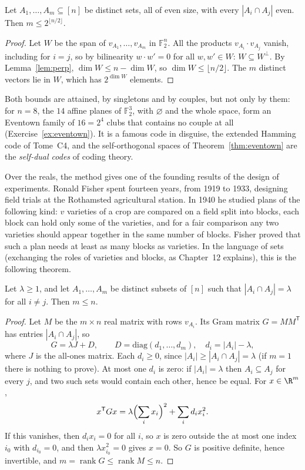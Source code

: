 \begin{theorem}\label{thm:eventown}
Let $A_1,\dots,A_m\subseteq[n]$ be distinct sets, all of even size, with every $|A_i\cap A_j|$ even. Then $m\le2^{\lfloor n/2\rfloor}$.
\end{theorem}
\begin{proof}
Let $W$ be the span of $v_{A_1},\dots,v_{A_m}$ in $\mathbb F_2^n$. All the products $v_{A_i}\cdot v_{A_j}$ vanish, including for $i=j$, so by bilinearity $w\cdot w'=0$ for
all $w,w'\in W$: $W\subseteq W^\perp$. By Lemma~\ref{lem:perp}, $\dim W\le n-\dim W$, so $\dim W\le\lfloor n/2\rfloor$. The $m$ distinct vectors lie in $W$, which has
$2^{\dim W}$ elements.
\end{proof}

Both bounds are attained, by singletons and by couples, but not only by them: for $n=8$, the $14$ affine planes of $\mathbb F_2^3$, with $\varnothing$ and the whole space, form an Eventown family of $16=2^4$ clubs
that contains no couple at all (Exercise~\ref{ex:eventown}). It is a famous code in disguise, the extended Hamming code of Tome~C4, and the self-orthogonal spaces of Theorem~\ref{thm:eventown} are the
\emph{self-dual codes} of coding theory.

Over the reals, the method gives one of the founding results of the design of experiments. Ronald Fisher spent fourteen years, from 1919 to 1933, designing field trials at the Rothamsted
agricultural station. In 1940 he studied plans of the following kind: $v$ varieties of a crop are compared on a field split into blocks, each block can hold only some of the varieties, and for a fair comparison any two varieties
should appear together in the same number of blocks. Fisher proved that such a plan needs at least as many blocks as varieties. In the language of sets (exchanging
the roles of varieties and blocks, as Chapter~12 explains), this is the following theorem.

\begin{theorem}\label{thm:fisher}
Let $\lambda\ge1$, and let $A_1,\dots,A_m$ be distinct subsets of $[n]$ such that $|A_i\cap A_j|=\lambda$ for all $i\ne j$. Then $m\le n$.
\end{theorem}
\begin{proof}
Let $M$ be the $m\times n$ real matrix with rows $v_{A_i}$. Its Gram matrix $G=MM^{\mathsf T}$ has entries $|A_i\cap A_j|$, so
\[
G=\lambda J+D,\qquad D=\mathrm{diag}(d_1,\dots,d_m),\quad d_i=|A_i|-\lambda,
\]
where $J$ is the all-ones matrix. Each $d_i\ge0$, since $|A_i|\ge|A_i\cap A_j|=\lambda$ (if $m=1$ there is nothing to prove). At most one $d_i$ is zero: if $|A_i|=\lambda$
then $A_i\subseteq A_j$ for every $j$, and two such sets would contain each other, hence be equal. For $x\in\R^m$,
\[
x^{\mathsf T}Gx=\lambda\Bigl(\sum_ix_i\Bigr)^2+\sum_id_ix_i^2.
\]
If this vanishes, then $d_ix_i=0$ for all $i$, so $x$ is zero outside the at most one index $i_0$ with $d_{i_0}=0$, and then $\lambda x_{i_0}^2=0$ gives $x=0$. So $G$ is positive definite,
hence invertible, and $m=\operatorname{rank}G\le\operatorname{rank}M\le n$.
\end{proof}

